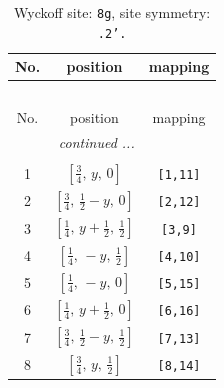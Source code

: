 \documentclass[fleqn,8pt]{jsarticle}
\begin{document}
\begin{longtable}{ccc}
\caption{Wyckoff site: {\tt 8g}, site symmetry: {\tt .2'.}}
 \\
 \hline \hline
No. & position & mapping \\ \hline \endfirsthead

\multicolumn{2}{l}{\tablename\ \thetable{}} \\
 \hline \hline
No. & position & mapping \\ \hline \endhead

 \hline \hline
\multicolumn{2}{r}{\footnotesize\it continued ...} \\ \endfoot

 \hline \hline
\multicolumn{2}{r}{} \\ \endlastfoot

1 & $\left[ \frac{3}{4},\, y,\, 0 \right]$ & {\tt [1,11]} \\ \hline
2 & $\left[ \frac{3}{4},\, \frac{1}{2} - y,\, 0 \right]$ & {\tt [2,12]} \\ \hline
3 & $\left[ \frac{1}{4},\, y + \frac{1}{2},\, \frac{1}{2} \right]$ & {\tt [3,9]} \\ \hline
4 & $\left[ \frac{1}{4},\, - y,\, \frac{1}{2} \right]$ & {\tt [4,10]} \\ \hline
5 & $\left[ \frac{1}{4},\, - y,\, 0 \right]$ & {\tt [5,15]} \\ \hline
6 & $\left[ \frac{1}{4},\, y + \frac{1}{2},\, 0 \right]$ & {\tt [6,16]} \\ \hline
7 & $\left[ \frac{3}{4},\, \frac{1}{2} - y,\, \frac{1}{2} \right]$ & {\tt [7,13]} \\ \hline
8 & $\left[ \frac{3}{4},\, y,\, \frac{1}{2} \right]$ & {\tt [8,14]} \\
\end{longtable}
\renewcommand{\arraystretch}{1.2}
\end{document}
